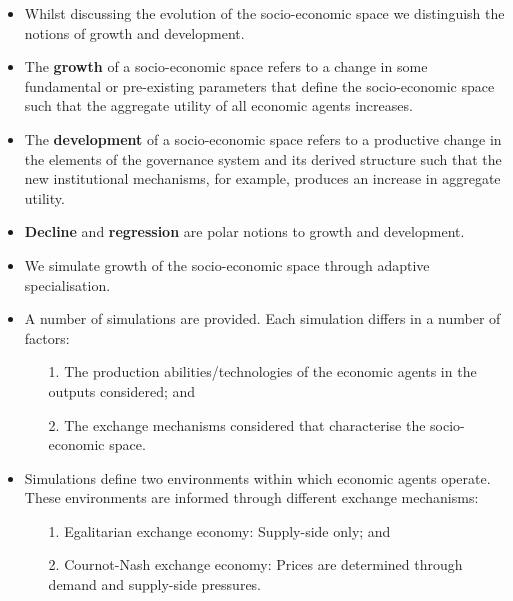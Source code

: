 \documentclass[10pt]{beamer}
\begin{document}
\begin{frame} %
\begin{itemize}
\item Whilst discussing the evolution of the socio-economic space we distinguish the notions of growth and development.
\medskip
\item The \textbf{growth} of a socio-economic space refers to a change in some fundamental or pre-existing parameters that define the socio-economic space such that the aggregate utility of all economic agents increases.
\medskip
\item The \textbf{development} of a socio-economic space refers to a productive change in the elements of the governance system and its derived structure such that the new institutional mechanisms, for example, produces an increase in aggregate utility.
\medskip
\item \textbf{Decline} and \textbf{regression} are polar notions to growth and development.
\end{itemize}
\end{frame}


\begin{frame} %
\begin{itemize}
\item We simulate growth of the socio-economic space through adaptive specialisation.
\medskip
\item A number of simulations are provided. Each simulation differs in a number of factors:
\begin{itemize}
\medskip
\item[1.] The production abilities/technologies of the economic agents in the outputs considered; and
\medskip
\item[2.] The exchange mechanisms considered that characterise the socio-economic space.
\end{itemize}
\medskip
\item Simulations define two environments within which economic agents operate. These environments are informed through different exchange mechanisms:
\begin{itemize}
\medskip
\item[1.] Egalitarian exchange economy: Supply-side only; and
\medskip
\item[2.] Cournot-Nash exchange economy: Prices are determined through demand and supply-side pressures.
\end{itemize}
\end{itemize}
\end{frame}
\end{document}
